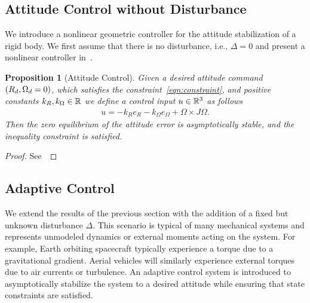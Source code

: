 \documentclass[10pt,fleqn]{IJCAS}  %
\newtheorem{prop}{Proposition}
\begin{document}
\begin{multicols}{2}
\subsection{Attitude Control without Disturbance}
We introduce a nonlinear geometric controller for the attitude stabilization of a rigid body.
We first assume that there is no disturbance, i.e., \( \Delta = 0 \) and present a nonlinear controller in~.
\begin{prop}[Attitude Control]\label{prop:att_control}
	Given a desired attitude command \( \left( R_d, \Omega_d = 0 \right) \), which satisfies the constraint~\cref{eqn:constraint}, and positive constants \( k_R, k_\Omega \in \mathbb{R} \) we define a control input \( u \in \mathbb{R}^3 \) as follows
	\begin{gather}
		u = -k_R e_R - k_\Omega e_\Omega + \Omega \times J \Omega . \label{eqn:nodist_control}
	\end{gather}
	Then the zero equilibrium of the attitude error is asymptotically stable, and the inequality constraint is satisfied.
\end{prop}
\begin{proof}
See~
\end{proof}

\subsection{Adaptive Control}
We extend the results of the previous section with the addition of a fixed but unknown disturbance \( \Delta \).
This scenario is typical of many mechanical systems and represents unmodeled dynamics or external moments acting on the system.
For example, Earth orbiting spacecraft typically experience a torque due to a gravitational gradient.
Aerial vehicles will similarly experience external torques due to air currents or turbulence.
An adaptive control system is introduced to asymptotically stabilize the system to a desired attitude while ensuring that state constraints are satisfied. %


\end{multicols}
\end{document}
